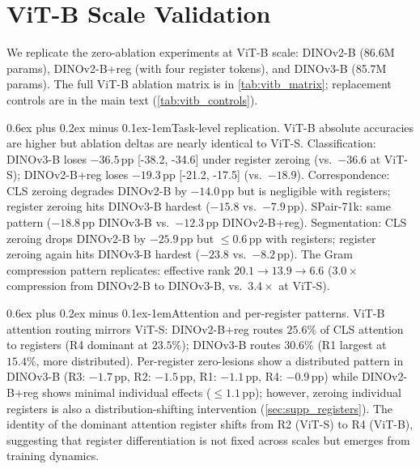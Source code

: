 \documentclass[10pt,twocolumn,letterpaper]{article}
\makeatletter
\renewcommand{\paragraph}{\@startsection{paragraph}{4}{\z@}%
  {0.6ex plus 0.2ex minus 0.1ex}{-1em}{\normalfont\normalsize\bfseries}}
\newcommand{\ci}[2]{{\scriptsize[#1, #2]}}
\makeatother
\begin{document}
\section{ViT-B Scale Validation}
\label{sec:supp_vitb}

We replicate the zero-ablation experiments at ViT-B scale: DINOv2-B (86.6M params),
DINOv2-B+reg (with four register tokens), and
DINOv3-B (85.7M params).
The full ViT-B ablation matrix is in \cref{tab:vitb_matrix};
replacement controls are in the main text (\cref{tab:vitb_controls}).

\paragraph{Task-level replication.}
ViT-B absolute accuracies are higher but ablation deltas are nearly identical to ViT-S.
Classification: DINOv3-B loses $-36.5$\,pp \ci{-38.2}{-34.6} under register zeroing (vs.\ $-36.6$ at ViT-S); DINOv2-B+reg loses $-19.3$\,pp \ci{-21.2}{-17.5} (vs.\ $-18.9$).
Correspondence: CLS zeroing degrades DINOv2-B by $-14.0$\,pp but is negligible with registers; register zeroing hits DINOv3-B hardest ($-15.8$ vs.\ $-7.9$\,pp).
SPair-71k: same pattern ($-18.8$\,pp DINOv3-B vs.\ $-12.3$\,pp DINOv2-B+reg).
Segmentation: CLS zeroing drops DINOv2-B by $-25.9$\,pp but $\leq\!0.6$\,pp with registers; register zeroing again hits DINOv3-B hardest ($-23.8$ vs.\ $-8.2$\,pp).
The Gram compression pattern replicates: effective rank $20.1 \to 13.9 \to 6.6$ ($3.0{\times}$ compression from DINOv2-B to DINOv3-B, vs.\ $3.4{\times}$ at ViT-S).

\paragraph{Attention and per-register patterns.}
ViT-B attention routing mirrors ViT-S: DINOv2-B+reg routes $25.6\%$
of CLS attention to registers (R4 dominant at $23.5\%$);
DINOv3-B routes $30.6\%$ (R1 largest at $15.4\%$, more distributed).
Per-register zero-lesions show a distributed pattern in DINOv3-B
(R3: $-1.7$\,pp, R2: $-1.5$\,pp, R1: $-1.1$\,pp, R4: $-0.9$\,pp)
while DINOv2-B+reg shows minimal individual effects ($\leq 1.1$\,pp);
however, zeroing individual registers is also a distribution-shifting intervention (\cref{sec:supp_registers}).
The identity of the dominant attention register shifts from R2 (ViT-S) to R4 (ViT-B), suggesting that register differentiation is not fixed across scales but emerges from training dynamics.

\end{document}
